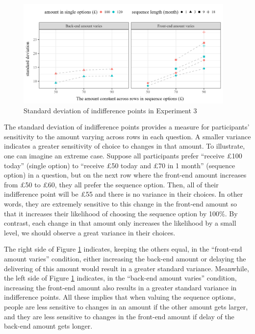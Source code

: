\documentclass[
  12pt,
]{article}
\begin{document}
\begin{figure}   
  \centering   
  \includegraphics[width=0.96\textwidth]{figures/exp1_indiff_point_sd.png}   
  \caption{Standard deviation of indifference points in Experiment 3}      
  \label{fig:exp1_indiff_sd} 
\end{figure}

The standard deviation of indifference points provides a measure for
participants' sensitivity to the amount varying across rows in each
question. A smaller variance indicates a greater sensitivity of choice
to changes in that amount. To illustrate, one can imagine an extreme
case. Suppose all participants prefer ``receive £100 today'' (single
option) to ``receive £50 today and £70 in 1 month'' (sequence option) in
a question, but on the next row where the front-end amount increases
from £50 to £60, they all prefer the sequence option. Then, all of their
indifference point will be £55 and there is no variance in their
choices. In other words, they are extremely sensitive to this change in
the front-end amount so that it increases their likelihood of choosing
the sequence option by 100\%. By contrast, each change in that amount
only increases the likelihood by a small level, we should observe a
great variance in their choices.

The right side of Figure \ref{fig:exp1_indiff_sd} indicates, keeping the
others equal, in the ``front-end amount varies'' condition, either
increasing the back-end amount or delaying the delivering of this amount
would result in a greater standard variance. Meanwhile, the left side of
Figure \ref{fig:exp1_indiff_sd} indicates, in the ``back-end amount
varies'' condition, increasing the front-end amount also results in a
greater standard variance in indifference points. All these implies that
when valuing the sequence options, people are less sensitive to changes
in an amount if the other amount gets larger, and they are less
sensitive to changes in the front-end amount if delay of the back-end
amount gets longer.
\end{document}
